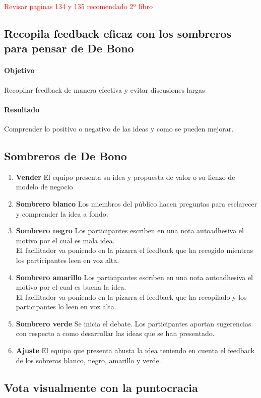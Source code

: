 \documentclass[11pt]{book}
\begin{document}
\textcolor{red}{Revisar paginas 134 y 135 recomendado 2º libro}
\subsection{Recopila feedback eficaz con los sombreros para pensar de De Bono}
\paragraph{Objetivo}
Recopilar feedback de manera efectiva y evitar discusiones largas
\paragraph{Resultado}
Comprender lo positivo o negativo de las ideas y como se pueden mejorar.
\subsection{Sombreros de De Bono}
\begin{enumerate}
\item \textbf{Vender}
El equipo presenta su idea y propuesta de valor o su lienzo de modelo de negocio
\item \textbf{Sombrero blanco}
Los miembros del público hacen preguntas para esclarecer y comprender la idea a fondo.
\item \textbf{Sombrero negro}
Los participantes escriben en una nota autoadhesiva el motivo por el cual es mala idea.\\
El facilitador va poniendo en la pizarra el feedback que ha recogido mientras los participantes leen en voz alta.
\item \textbf{Sombrero amarillo}
Los participantes escriben en una nota autoadhesiva el motivo por el cual es buena la idea.\\
El facilitador va poniendo en la pizarra el feedback que ha recopilado y los participantes lo leen en voz alta.
\item \textbf{Sombrero verde}
Se inicia el debate. Los participantes aportan sugerencias con respecto a como desarrollar las ideas que se han presentado.
\item \textbf{Ajuste}
El equipo que presenta ahusta la idea teniendo en cuenta el feedback de los sobreros blanco, negro, amarillo y verde.

\end{enumerate}
\subsection{Vota visualmente con la puntocracia}
\end{document}
